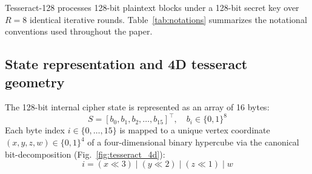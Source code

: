 \documentclass[10pt,twocolumn]{article}
\begin{document}
Tesseract-128 processes 128-bit plaintext blocks under a 128-bit secret key over $R = 8$ identical iterative rounds. Table~\ref{tab:notations} summarizes the notational conventions used throughout the paper.

\begin{table}[htbp]
\caption{Notational conventions.}
\label{tab:notations}
\centering
\small
{}
\end{table}

\subsection{State representation and 4D tesseract geometry}
The 128-bit internal cipher state is represented as an array of 16 bytes:
\begin{equation}
    S = [b_0, b_1, b_2, \dots, b_{15}]^\top, \quad b_i \in \{0, 1\}^8
\end{equation}
Each byte index $i \in \{0, \dots, 15\}$ is mapped to a unique vertex coordinate $(x, y, z, w) \in \{0, 1\}^4$ of a four-dimensional binary hypercube via the canonical bit-decomposition (Fig.~\ref{fig:tesseract_4d}):
\begin{equation}
    i = (x \ll 3) \mid (y \ll 2) \mid (z \ll 1) \mid w
\end{equation}
\end{document}
